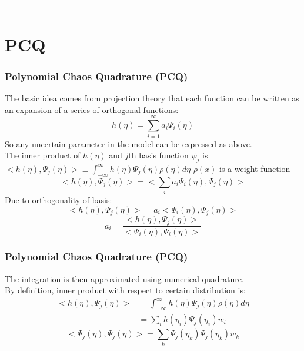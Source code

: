 \documentclass[10pt]{beamer}
\begin{document}
--------------------
\section{PCQ}

\begin{frame}
\frametitle{Polynomial Chaos Quadrature (PCQ)}
The basic idea comes from projection theory that each function can be written as an expansion of a series of orthogonal functions:\\
\begin{equation}
     h(\eta)= \sum_{i=1}^\infty a_i \Psi_i (\eta) \label{eq:pcq-expansion}  
\end{equation}
So any uncertain parameter in the model can be expressed as above. \\
The inner product of $h(\eta)$ and $j$th basis function $\psi_j$ is $<h(\eta), \Psi_j (\eta) > \equiv \int_{-\infty}^{\infty} h(\eta) \Psi_j (\eta) \rho(\eta) d \eta $ $\rho(x)$ is a weight function
\begin{equation}
     <h(\eta), \Psi_j (\eta) >= <\sum_i a_i \Psi_i (\eta), \Psi_j (\eta)>\label{eq:pcq-inner-product}
\end{equation}
Due to orthogonality of basis:
\begin{equation}
     <h(\eta), \Psi_j (\eta) >= a_i<\Psi_i (\eta), \Psi_j (\eta)> \label{eq:pcq-inner-product-orthogonal}
\end{equation}
\begin{equation}
     a_i= \frac{<h(\eta), \Psi_j (\eta) >}{<\Psi_i (\eta), \Psi_i (\eta)>}\label{eq:pcq-coef}
\end{equation}
\end{frame}
\begin{frame}
\frametitle{Polynomial Chaos Quadrature (PCQ)}
The integration is then approximated using numerical quadrature.\\
By definition, inner product with respect to certain distribution is:
\begin{equation}
\begin{split}
      <h(\eta), \Psi_j (\eta) > &= \int_{-\infty}^{\infty} h(\eta) \Psi_j (\eta) \rho(\eta) d \eta \\
      &= \sum_i h(\eta_i) \Psi_j (\eta_i) w_i 
\end{split} \label{eq:pcq-gaussian-h} 
\end{equation}
\begin{equation}
      <\Psi_j (\eta), \Psi_j (\eta) > = \sum_k \Psi_j (\eta_k) \Psi_j (\eta_k) w_k \label{eq:pcq-gaussian-psi} 
\end{equation}
\end{frame}
\end{document}
